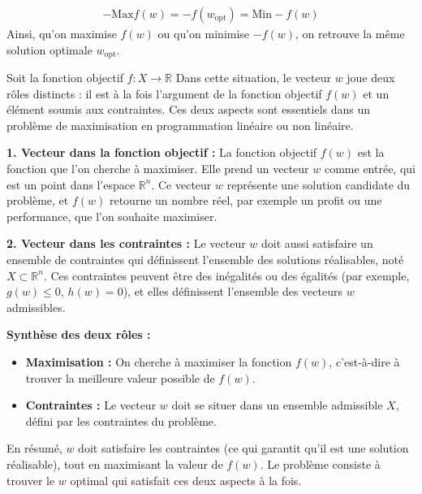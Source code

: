 \documentclass{report}
\begin{document}
\begin{multicols*}{3}
\begin{Preuve}{}{}
    \begin{align*}
        - \text{Max} f(w) = 
        - f\left(w_{\text{opt}}\right) = 
        \text{Min} -f(w)
    \end{align*}
    Ainsi, qu'on maximise $f(w)$ ou qu'on minimise $-f(w)$, on retrouve la 
    même solution optimale $w_{\text{opt}}$.
\end{Preuve}






\begin{Explication*}{}{}
    Soit la fonction objectif $f : X \rightarrow \mathbb{R}$  
Dans cette situation, le vecteur \( w \) joue deux rôles distincts : il est à la 
fois l'argument de la fonction objectif \( f(w) \) et un élément soumis aux 
contraintes. Ces deux aspects sont essentiels dans un problème de maximisation 
en programmation linéaire ou non linéaire.

\vspace{1em}%
\textbf{1. Vecteur dans la fonction objectif :}
La fonction objectif \( f(w) \) est la fonction que l'on cherche à maximiser. 
Elle prend un vecteur \( w \) comme entrée, qui est un point dans l'espace 
\( \mathbb{R}^n \). Ce vecteur \( w \) représente une solution candidate du 
problème, et \( f(w) \) retourne un nombre réel, par exemple un profit ou une 
performance, que l'on souhaite maximiser.

\vspace{1em}%
\textbf{2. Vecteur dans les contraintes :}
Le vecteur \( w \) doit aussi satisfaire un ensemble de contraintes qui 
définissent l'ensemble des solutions réalisables, noté \( X \subset \mathbb{R}^n \).
Ces contraintes peuvent être des inégalités ou des égalités (par exemple, 
\( g(w) \leq 0 \), \( h(w) = 0 \)), et elles définissent l'ensemble des vecteurs 
\( w \) admissibles.

\vspace{1em}%
\textbf{Synthèse des deux rôles :}
\begin{itemize}
    \item \textbf{Maximisation :} On cherche à maximiser la fonction \( f(w) \), 
    c'est-à-dire à trouver la meilleure valeur possible de \( f(w) \).
    \item \textbf{Contraintes :} Le vecteur \( w \) doit se situer dans un 
    ensemble admissible \( X \), défini par les contraintes du problème.
\end{itemize}

En résumé, \( w \) doit satisfaire les contraintes (ce qui garantit qu'il est 
une solution réalisable), tout en maximisant la valeur de \( f(w) \). Le problème
consiste à trouver le \( w \) optimal qui satisfait ces deux aspects à la fois.
\end{Explication*}                  


\end{multicols*}
\end{document}
